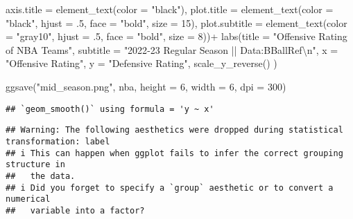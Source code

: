 \documentclass[
]{article}
\newenvironment{Shaded}{\begin{snugshade}}{\end{snugshade}}
\newcommand{\AttributeTok}[1]{\textcolor[rgb]{0.77,0.63,0.00}{#1}}
\newcommand{\DecValTok}[1]{\textcolor[rgb]{0.00,0.00,0.81}{#1}}
\newcommand{\FunctionTok}[1]{\textcolor[rgb]{0.00,0.00,0.00}{#1}}
\newcommand{\NormalTok}[1]{#1}
\newcommand{\SpecialCharTok}[1]{\textcolor[rgb]{0.00,0.00,0.00}{#1}}
\newcommand{\StringTok}[1]{\textcolor[rgb]{0.31,0.60,0.02}{#1}}
\begin{document}
\begin{Shaded}
\begin{Highlighting}[]
    \AttributeTok{axis.title =} \FunctionTok{element\_text}\NormalTok{(}\AttributeTok{color =} \StringTok{"black"}\NormalTok{),}
    \AttributeTok{plot.title =} \FunctionTok{element\_text}\NormalTok{(}\AttributeTok{color =} \StringTok{"black"}\NormalTok{, }\AttributeTok{hjust =}\NormalTok{ .}\DecValTok{5}\NormalTok{, }\AttributeTok{face =} \StringTok{"bold"}\NormalTok{, }\AttributeTok{size =} \DecValTok{15}\NormalTok{),}
    \AttributeTok{plot.subtitle =} \FunctionTok{element\_text}\NormalTok{(}\AttributeTok{color =} \StringTok{"gray10"}\NormalTok{, }\AttributeTok{hjust =}\NormalTok{ .}\DecValTok{5}\NormalTok{, }\AttributeTok{face =} \StringTok{"bold"}\NormalTok{, }\AttributeTok{size =} \DecValTok{8}\NormalTok{))}\SpecialCharTok{+}
  \FunctionTok{labs}\NormalTok{(}\AttributeTok{title =} \StringTok{"Offensive Rating of NBA Teams"}\NormalTok{,}
       \AttributeTok{subtitle =} \StringTok{"2022{-}23 Regular Season || Data:BBallRef}\SpecialCharTok{\textbackslash{}n}\StringTok{"}\NormalTok{,}
       \AttributeTok{x =} \StringTok{"Offensive Rating"}\NormalTok{,}
       \AttributeTok{y =} \StringTok{"Defensive Rating"}\NormalTok{,}
       \FunctionTok{scale\_y\_reverse}\NormalTok{()}
\NormalTok{  )}

\FunctionTok{ggsave}\NormalTok{(}\StringTok{"mid\_season.png"}\NormalTok{, nba, }\AttributeTok{height =} \DecValTok{6}\NormalTok{, }\AttributeTok{width =} \DecValTok{6}\NormalTok{, }\AttributeTok{dpi =} \DecValTok{300}\NormalTok{)}
\end{Highlighting}
\end{Shaded}

\begin{verbatim}
## `geom_smooth()` using formula = 'y ~ x'
\end{verbatim}

\begin{verbatim}
## Warning: The following aesthetics were dropped during statistical transformation: label
## i This can happen when ggplot fails to infer the correct grouping structure in
##   the data.
## i Did you forget to specify a `group` aesthetic or to convert a numerical
##   variable into a factor?
\end{verbatim}
\end{document}
